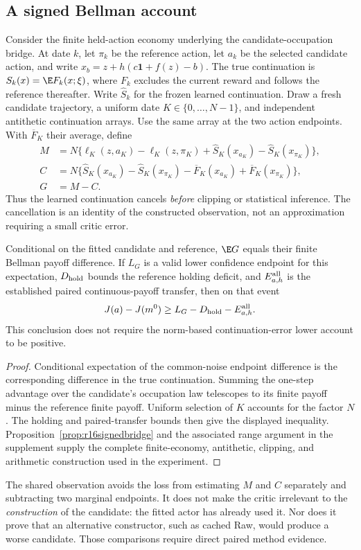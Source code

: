 \subsection{A signed Bellman account}\label{sec:r16signedreading}
Consider the finite held-action economy underlying the candidate-occupation bridge. At date $k$, let $\pi_k$ be the reference action, let $a_k$ be the selected candidate action, and write $x_b=z+h(c\bm1+f(z)-b)$. The true continuation is $S_k(x)=\E F_k(x;\xi)$, where $F_k$ excludes the current reward and follows the reference thereafter. Write $\widehat S_k$ for the frozen learned continuation. Draw a fresh candidate trajectory, a uniform date $K\in\{0,\ldots,N-1\}$, and independent antithetic continuation arrays. Use the same array at the two action endpoints. With $\overline F_K$ their average, define
\begin{align*}
 M&=N\{\ell_K(z,a_K)-\ell_K(z,\pi_K)
             +\widehat S_K(x_{a_K})-\widehat S_K(x_{\pi_K})\},\\
 C&=N\{\widehat S_K(x_{a_K})-\widehat S_K(x_{\pi_K})
             -\overline F_K(x_{a_K})+\overline F_K(x_{\pi_K})\},\\
 G&=M-C.
\end{align*}
Thus the learned continuation cancels \emph{before} clipping or statistical inference. The cancellation is an identity of the constructed observation, not an approximation requiring a small critic error.

\begin{proposition}\label{prop:r16signedreading}
Conditional on the fitted candidate and reference, $\E G$ equals their finite Bellman payoff difference. If $L_G$ is a valid lower confidence endpoint for this expectation, $D_{\rm hold}$ bounds the reference holding deficit, and $E_{a,h}^{\rm all}$ is the established paired continuous-payoff transfer, then on that event
\[
 J(a)-J(m^0)\ge L_G-D_{\rm hold}-E_{a,h}^{\rm all}.
\]
This conclusion does not require the norm-based continuation-error lower account to be positive.
\end{proposition}
\begin{proof}
Conditional expectation of the common-noise endpoint difference is the corresponding difference in the true continuation. Summing the one-step advantage over the candidate's occupation law telescopes to its finite payoff minus the reference finite payoff. Uniform selection of $K$ accounts for the factor $N$. The holding and paired-transfer bounds then give the displayed inequality. Proposition~\ref{prop:r16signedbridge} and the associated range argument in the supplement supply the complete finite-economy, antithetic, clipping, and arithmetic construction used in the experiment.
\end{proof}

The shared observation avoids the loss from estimating $M$ and $C$ separately and subtracting two marginal endpoints. It does not make the critic irrelevant to the \emph{construction} of the candidate: the fitted actor has already used it. Nor does it prove that an alternative constructor, such as cached Raw, would produce a worse candidate. Those comparisons require direct paired method evidence.
